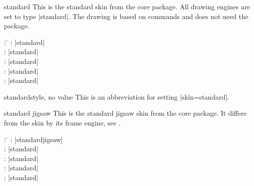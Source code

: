 \begin{docSkin}{standard}
  This is the standard skin from the core package. All drawing engines
  are set to type |standard|. The drawing is based on  commands and
  does not need the  package.
\begin{tcolorbox}[skintable=standard]
  \begin{tabbing}
    : \=\kill
    :           \> |standard|\\
    : \> |standard|\\ 
    :        \> |standard|\\
    :    \> |standard|\\
    :           \> |standard|
  \end{tabbing}
\end{tcolorbox}
\end{docSkin}

\begin{docTcbKey}{standard}{}{style, no value}
  This is an abbreviation for setting |skin=standard|.
\end{docTcbKey}

\begin{dispExample}
\end{dispExample}

\clearpage

\begin{docSkin}{standard jigsaw}
  This is the standard jigsaw skin from the core package. It differs from
  the skin  by its frame engine, see .
\begin{tcolorbox}[skintable=standard jigsaw]
  \begin{tabbing}
    : \=\kill
    :           \> |standardjigsaw|\\
    : \> |standard|\\ 
    :        \> |standard|\\
    :    \> |standard|\\
    :           \> |standard|
  \end{tabbing}
\end{tcolorbox}
\end{docSkin}

